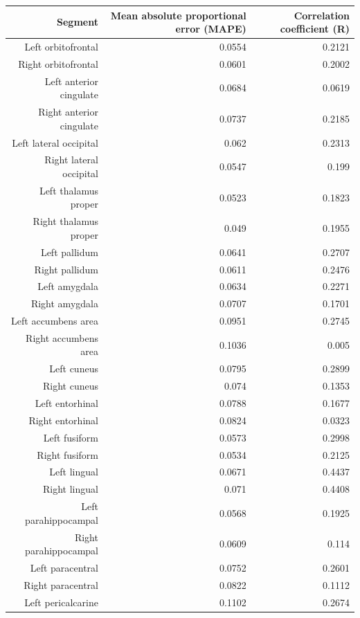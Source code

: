 \documentclass{article}
\begin{document}
\begin{table}[h]

\begin{centering}
  \small
  \begin{tabular}{|r|r|r|}
    \hline\hline
    \textbf{Segment} & \textbf{Mean absolute proportional error (MAPE)} & \textbf{Correlation coefficient (R)} \\\hline
    Left orbitofrontal & 0.0554 & 0.2121 \\
    Right orbitofrontal & 0.0601 & 0.2002 \\
    Left anterior cingulate & 0.0684 & 0.0619 \\
    Right anterior cingulate & 0.0737 & 0.2185 \\
    Left lateral occipital & 0.062 & 0.2313 \\
    Right lateral occipital & 0.0547 & 0.199 \\
    Left thalamus proper & 0.0523 & 0.1823 \\
    Right thalamus proper & 0.049 & 0.1955 \\
    Left pallidum & 0.0641 & 0.2707 \\
    Right pallidum & 0.0611 & 0.2476 \\
    Left amygdala & 0.0634 & 0.2271 \\
    Right amygdala & 0.0707 & 0.1701 \\
    Left accumbens area & 0.0951 & 0.2745 \\
    Right accumbens area & 0.1036 & 0.005 \\
    Left cuneus & 0.0795 & 0.2899 \\
    Right cuneus & 0.074 & 0.1353 \\
    Left entorhinal & 0.0788 & 0.1677 \\
    Right entorhinal & 0.0824 & 0.0323 \\
    Left fusiform & 0.0573 & 0.2998 \\
    Right fusiform & 0.0534 & 0.2125 \\
    Left lingual & 0.0671 & 0.4437 \\
    Right lingual & 0.071 & 0.4408 \\
    Left parahippocampal & 0.0568 & 0.1925 \\
    Right parahippocampal & 0.0609 & 0.114 \\
    Left paracentral & 0.0752 & 0.2601 \\
    Right paracentral & 0.0822 & 0.1112 \\
    Left pericalcarine & 0.1102 & 0.2674 \\

\end{tabular}
\end{centering}
\end{table}
\end{document}

